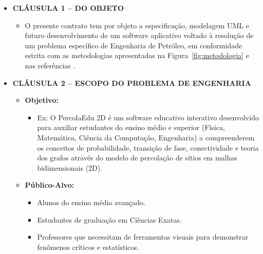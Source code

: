 \documentclass[12pt,a4paper]{article}
\begin{document}
\begin{itemize}[leftmargin=*]

  \item \textbf{CLÁUSULA 1 -- DO OBJETO}
  \begin{itemize}
    \item O presente contrato tem por objeto a especificação, modelagem UML e futuro desenvolvimento de um software aplicativo voltado à resolução de um problema específico de Engenharia de Petróleo, em conformidade estrita com as metodologias apresentadas na Figura~\ref{fig:metodologia} e nas referências \cite{Rumbaugh1994, Bueno2003, Blaha2006}.
  \end{itemize}

  \item \textbf{CLÁUSULA 2 -- ESCOPO DO PROBLEMA DE ENGENHARIA}
  \begin{itemize}
    \item \textbf{Objetivo:}
    \begin{itemize}
      \item Ex: O PercolaEdu 2D é um software educativo interativo desenvolvido para auxiliar estudantes do ensino médio e superior (Física, Matemática, Ciência da Computação, Engenharia) a compreenderem os conceitos de probabilidade, transição de fase, conectividade e teoria dos grafos através do modelo de percolação de sítios em malhas bidimensionais (2D).
    \end{itemize}

    \item \textbf{Público-Alvo:}
    \begin{itemize}
      \item Alunos do ensino médio avançado.
      \item Estudantes de graduação em Ciências Exatas.
      \item Professores que necessitam de ferramentas visuais para demonstrar fenômenos críticos e estatísticos.
    \end{itemize}


\end{itemize}
\end{itemize}
\end{document}
